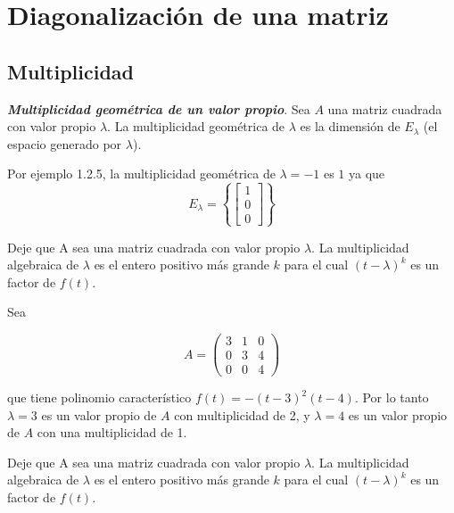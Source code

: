 \documentclass{report}
\begin{document}
    \section{Diagonalización de una matriz}
    
    \subsection*{Multiplicidad}
    
    \begin{defBox}
        \textit{\textbf{Multiplicidad geométrica de un valor propio}}. Sea $A$ una matriz cuadrada con valor propio $\lambda$. La multiplicidad geométrica de $\lambda$ es la dimensión de $E_\lambda$ (el espacio generado por $\lambda$).
    \end{defBox}
    
    Por ejemplo 1.2.5, la multiplicidad geométrica de $\lambda = -1$ es $1$ ya que
    $$E_\lambda = \left\{ \begin{bmatrix}1\\0\\0\end{bmatrix} \right\}$$
    
    \begin{defBox}
        Deje que A sea una matriz cuadrada con valor propio $\lambda$. La multiplicidad algebraica de $\lambda$ es el entero positivo más grande $k$ para el cual $(t-\lambda)^k$ es un factor de $f(t)$.
    \end{defBox}

    \begin{Example}
        Sea

        $$A =\begin{pmatrix}
            3 & 1 & 0\\
            0 & 3 & 4\\
            0 & 0 & 4
        \end{pmatrix}$$

        que tiene polinomio característico $f(t) = -(t-3)^2(t-4)$. Por lo tanto $\lambda = 3$ es un valor propio de $A$ con multiplicidad de 2, y $\lambda = 4$ es un valor propio de $A$ con una multiplicidad de 1.
    \end{Example}
    
    \begin{thBox}
        Deje que A sea una matriz cuadrada con valor propio $\lambda$. La multiplicidad algebraica de $\lambda$ es el entero positivo más grande $k$ para el cual $(t-\lambda)^k$ es un factor de $f(t)$.
    \end{thBox}
    
\end{document}
